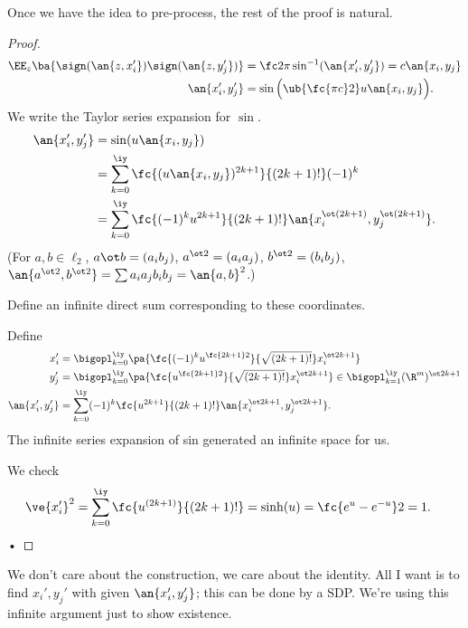 Once we have the idea to pre-process, the rest of the proof is natural. 
\begin{proof}
\begin{align}
\EE_z\ba{\sign(\an{z,x_i'})\sign(\an{z,y_j'})}
& = \fc 2\pi \sin^{-1} (\an{x_i',y_j'}) = c\an{x_i,y_j}\\
\an{x_i',y_j'} &=  \sin\Big(\ub{\fc{\pi c}2}u\an{x_i,y_j}\Big).
\end{align}
We write the Taylor series expansion for $\sin$. 
\begin{align}
\an{x_i',y_j'} &= \sin(u\an{x_i,y_j})\\
&=\sum_{k=0}^{\iy} \fc{(u\an{x_i,y_j})^{2k+1}}{(2k+1)!} (-1)^k\\
&=\sum_{k=0}^{\iy} \fc{(-1)^k u^{2k+1}}{(2k+1)!} \an{x_i^{\ot (2k+1)}, y_j^{\ot (2k+1)}}.
\end{align}
(For $a,b\in \ell_2$, $a\ot b = (a_ib_j)$, $a^{\ot 2}=(a_ia_j)$, $b^{\ot 2} = (b_ib_j)$, $\an{a^{\ot 2},b^{\ot 2}}=\sum a_ia_j b_ib_j = \an{a,b}^2$.)

Define an infinite direct sum corresponding to these coordinates.

Define 
\begin{align}
x_i' &= \bigopl_{k=0}^{\iy} \pa{ \fc{(-1)^k u^{\fc{2k+1}2}}{\sqrt{(2k+1)!}} x_i^{\ot 2k+1}}\\
y_j' &= \bigopl_{k=0}^{\iy} \pa{ \fc{u^{\fc{2k+1}2}}{\sqrt{(2k+1)!}} x_i^{\ot 2k+1}}\in \bigopl_{k=1}^{\iy} (\R^m)^{\ot 2k+1}\\
\an{x_i',y_j'} &=\sum_{k=0}^{\iy} (-1)^k \fc{u^{2k+1}}{(2k+1)!} \an{x_i^{\ot 2k+1}, y_j^{\ot 2k+1}}.
\end{align}
The infinite series expansion of sin generated an infinite space for us. %

We check
\begin{align}
\ve{x_i'}^2 &=\sum_{k=0}^{\iy} \fc{u^{(2k+1)}}{(2k+1)!} = \sinh(u) = \fc{e^u-e^{-u}}2=1.
\end{align}•
\end{proof}
We don't care about the construction, we care about the identity. All I want is to find $x_i',y_j'$ with given $\an{x_i',y_j'}$; this can be done by a SDP. We're using this infinite argument just to show existence.


